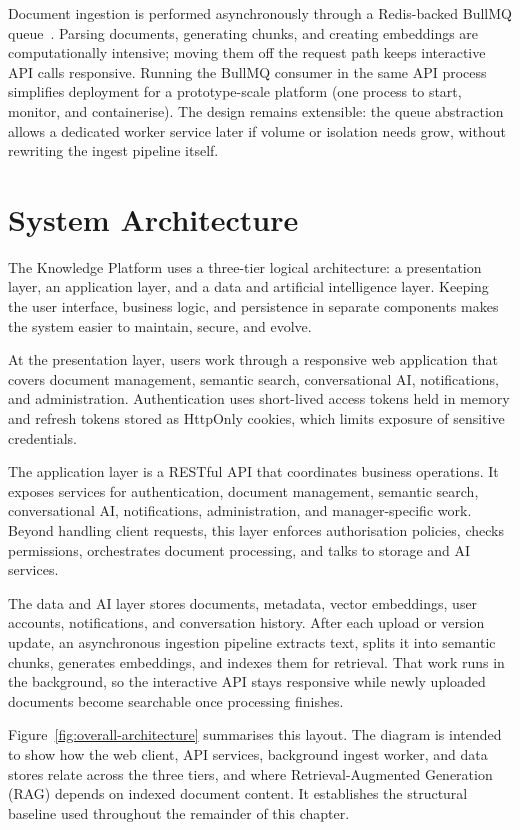 Document ingestion is performed asynchronously through a Redis-backed BullMQ
queue~\cite{redis-docs, bullmq-docs}. Parsing documents, generating chunks, and
creating embeddings are computationally intensive; moving them off the request
path keeps interactive API calls responsive. Running the BullMQ consumer in the
same API process simplifies deployment for a prototype-scale platform (one process
to start, monitor, and containerise). The design remains extensible: the queue
abstraction allows a dedicated worker service later if volume or isolation needs
grow, without rewriting the ingest pipeline itself.

\section{System Architecture}
\label{sec:overall-architecture}

The Knowledge Platform uses a three-tier logical architecture: a presentation layer,
an application layer, and a data and artificial intelligence layer. Keeping the user
interface, business logic, and persistence in separate components makes the system
easier to maintain, secure, and evolve.

At the presentation layer, users work through a responsive web application that
covers document management, semantic search, conversational AI, notifications, and
administration. Authentication uses short-lived access tokens held in memory and
refresh tokens stored as HttpOnly cookies, which limits exposure of sensitive
credentials.

The application layer is a RESTful API that coordinates business operations. It
exposes services for authentication, document management, semantic search,
conversational AI, notifications, administration, and manager-specific work. Beyond
handling client requests, this layer enforces authorisation policies, checks
permissions, orchestrates document processing, and talks to storage and AI
services.

The data and AI layer stores documents, metadata, vector embeddings, user accounts,
notifications, and conversation history. After each upload or version update, an
asynchronous ingestion pipeline extracts text, splits it into semantic chunks,
generates embeddings, and indexes them for retrieval. That work runs in the
background, so the interactive API stays responsive while newly uploaded documents
become searchable once processing finishes.

Figure~\ref{fig:overall-architecture} summarises this layout. The diagram is
intended to show how the web client, API services, background ingest worker, and
data stores relate across the three tiers, and where Retrieval-Augmented Generation
(RAG) depends on indexed document content. It establishes the structural baseline
used throughout the remainder of this chapter.

